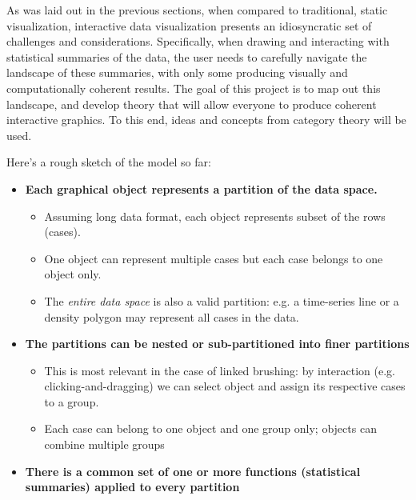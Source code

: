 \documentclass[12pt,a4paper]{article}
\begin{document}
As was laid out in the previous sections, when compared to traditional, static visualization, interactive data visualization presents an idiosyncratic set of challenges and considerations. Specifically, when drawing and interacting with statistical summaries of the data, the user needs to carefully navigate the landscape of these summaries, with only some producing visually and computationally coherent results. The goal of this project is to map out this landscape, and develop theory that will allow everyone to produce coherent interactive graphics. To this end, ideas and concepts from category theory will be used. 

Here's a rough sketch of the model so far:

\begin{itemize}

\item \textbf{Each graphical object represents a partition of the data space.}
  \begin{itemize}
  \item Assuming long data format, each object represents subset of the rows (cases).
  \item One object can represent multiple cases but each case belongs to one object only.
  \item The \textit{entire data space} is also a valid partition: e.g. a time-series line or a density polygon may represent all cases in the data.
  \end{itemize}
  
\item \textbf{The partitions can be nested or sub-partitioned into finer partitions}
  \begin{itemize}

  \item This is most relevant in the case of linked brushing: by interaction (e.g. clicking-and-dragging) we can select object and assign its respective cases to a group.
  \item Each case can belong to one object and one group only; objects can combine multiple groups
  \end{itemize}

\item \textbf{There is a common set of one or more functions (statistical summaries) applied to every partition}


\end{itemize}
\end{document}
